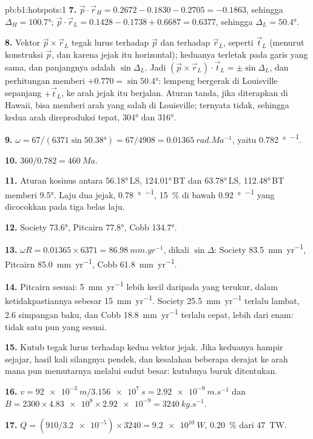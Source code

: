\begin{solution}{pb:b1:hotspots:1}
\textbf{7.} $\vec p\cdot\vec r_H = 0.2672 - 0.1830 - 0.2705 = -0.1863$, sehingga
$\Delta_H = \ang{100.7}$; $\vec p\cdot\vec r_L = 0.1428 - 0.1738 + 0.6687 =
0.6377$, sehingga $\Delta_L = \ang{50.4}$.

\textbf{8.} Vektor $\vec p\times\vec r_L$ tegak lurus terhadap $\vec p$ dan
terhadap $\vec r_L$, seperti $\vec t_L$ (menurut konstruksi $\vec p$, dan karena jejak itu
horizontal); keduanya terletak pada garis yang sama, dan panjangnya adalah
$\sin\Delta_L$. Jadi $(\vec p\times\vec r_L)\cdot\vec t_L = \pm\sin\Delta_L$, dan
perhitungan memberi $+0.770 = \sin\ang{50.4}$: lempeng bergerak di Louisville
sepanjang $+\vec t_L$, ke arah jejak itu berjalan. Aturan tanda, jika diterapkan di Hawaii,
bisa memberi arah yang salah di Louisville; ternyata tidak, sehingga kedua arah direproduksi
tepat, \ang{304} dan \ang{316}.

\textbf{9.} $\omega = 67/(6371\sin\ang{50.38}) = 67/4908 =
\qty{0.01365}{rad.Ma^{-1}}$, yaitu \qty{0.782}{\degree\per\Ma}.

\textbf{10.} $360/0.782 = \qty{460}{Ma}$.

\textbf{11.} Aturan kosinus antara \ang{56.18}\,LS, \ang{124.01}\,BT dan
\ang{63.78}\,LS, \ang{112.48}\,BT memberi \ang{9.5}. Laju dua jejak,
\qty{0.78}{\degree\per\Ma}, \qty{15}{\percent} di bawah
\qty{0.92}{\degree\per\Ma} yang dicocokkan pada tiga belas laju.

\textbf{12.} Society \ang{73.6}, Pitcairn \ang{77.8}, Cobb \ang{134.7}.

\textbf{13.} $\omega R = 0.01365\times6371 = \qty{86.98}{mm.yr^{-1}}$, dikali
$\sin\Delta$: Society \qty{83.5}{mm.yr^{-1}}, Pitcairn
\qty{85.0}{mm.yr^{-1}}, Cobb \qty{61.8}{mm.yr^{-1}}.

\textbf{14.} Pitcairn sesuai: \qty{5}{mm.yr^{-1}} lebih kecil daripada yang terukur, dalam
ketidakpastiannya sebesar \qty{15}{mm.yr^{-1}}. Society \qty{25.5}{mm.yr^{-1}} terlalu lambat, 2.6
simpangan baku, dan Cobb \qty{18.8}{mm.yr^{-1}} terlalu cepat, lebih dari enam:
tidak satu pun yang sesuai.

\textbf{15.} Kutub tegak lurus terhadap kedua vektor jejak. Jika keduanya hampir sejajar,
hasil kali silangnya pendek, dan kesalahan beberapa derajat ke arah mana pun memutarnya
melalui sudut besar: kutubnya buruk ditentukan.

\textbf{16.} $v = \qty{92e-3}{m}/\qty{3.156e7}{s} = \qty{2.92e-9}{m.s^{-1}}$
dan $B = 2300\times\num{4.83e8}\times\num{2.92e-9} = \qty{3240}{kg.s^{-1}}$.

\textbf{17.} $Q = (910/\num{3.2e-5})\times3240 = \qty{9.2e10}{W}$,
\qty{0.20}{\percent} dari \qty{47}{TW}.


\end{solution}
